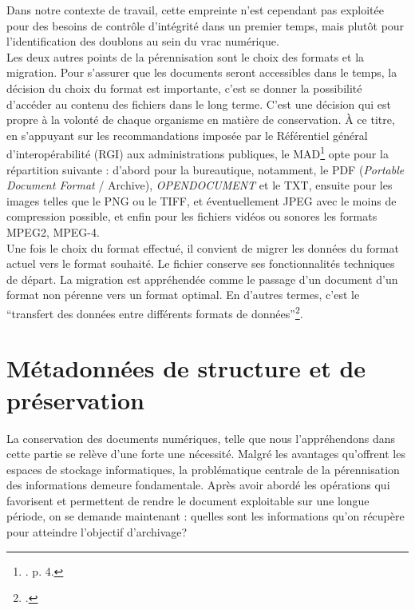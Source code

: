 Dans notre contexte de travail, cette empreinte n'est cependant pas exploitée pour des besoins de contrôle d'intégrité dans un premier temps, mais plutôt pour l'identification des doublons au sein du vrac numérique. \\[0.1cm]

Les deux autres points de la pérennisation sont le choix des formats et la migration. Pour s'assurer que les documents seront accessibles dans le temps, la décision du choix du format est importante, c'est se donner la possibilité d'accéder au contenu des fichiers dans le long terme. C'est une décision qui est propre à la volonté de chaque organisme en matière de conservation. À ce titre, en s'appuyant sur les recommandations imposée par le Référentiel général d'interopérabilité (RGI) aux administrations publiques, le MAD\footnote{\cite{bomel-dion-note-cadrage}. p. 4.} opte pour la répartition suivante : d'abord pour la bureautique, notamment, le PDF (\textit{Portable Document Format} / Archive), \textit{OPENDOCUMENT} et le TXT, ensuite pour les images telles que le PNG ou le TIFF, et éventuellement JPEG avec le moins de compression possible, et enfin pour les fichiers vidéos ou sonores les formats MPEG2, MPEG-4.\\[0.1cm]
		

Une fois le choix du format effectué, il convient de migrer les données du format actuel vers le format souhaité. Le fichier conserve ses fonctionnalités techniques de départ. La migration est appréhendée comme le passage d'un document d'un format non pérenne vers un format optimal. En d'autres termes, c'est le \enquote{transfert des données entre différents formats de données}\footnote{\cite{docuteam_formats_archivage}.}. 



\section{Métadonnées de structure et de préservation}

La conservation des documents numériques, telle que nous l’appréhendons dans cette partie se relève d’une forte une nécessité. Malgré les avantages qu'offrent les espaces de stockage informatiques, la problématique centrale de la pérennisation des informations demeure fondamentale. Après avoir abordé les opérations qui favorisent et permettent de rendre le document exploitable sur une longue période, on se demande maintenant : quelles sont les informations qu'on récupère pour atteindre l'objectif d'archivage?

